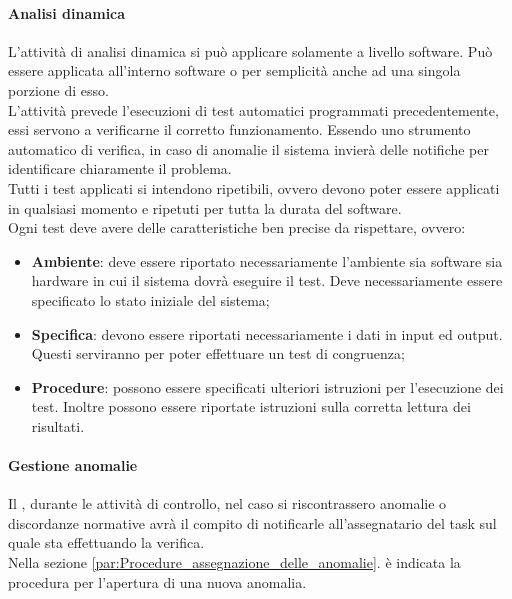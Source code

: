 			\paragraph{Analisi dinamica} %
			\label{par:analisi_dinamica}
			L'attività di analisi dinamica si può applicare solamente a livello software. Può essere applicata all'interno software o per semplicità anche ad una singola porzione di esso.\\
			L'attività prevede l'esecuzioni di test automatici programmati precedentemente, essi servono a verificarne il corretto funzionamento. Essendo uno strumento automatico di verifica, in caso di anomalie il sistema invierà delle notifiche per identificare chiaramente il problema.\\
			Tutti i test applicati si intendono ripetibili, ovvero devono poter essere applicati in qualsiasi momento e ripetuti per tutta la durata del software.\\
			Ogni test deve avere delle caratteristiche ben precise da rispettare, ovvero:
			\begin{itemize}
				\item \textbf{Ambiente}: deve essere riportato necessariamente l'ambiente sia software sia hardware in cui il sistema dovrà eseguire il test. Deve necessariamente essere specificato lo stato iniziale del sistema;
				\item \textbf{Specifica}: devono essere riportati necessariamente i dati in input ed output. Questi serviranno per poter effettuare un test di congruenza;
				\item \textbf{Procedure}: possono essere specificati ulteriori istruzioni per l'esecuzione dei test. Inoltre possono essere riportate istruzioni sulla corretta lettura dei risultati.
			\end{itemize}

			\paragraph{Gestione anomalie}
			Il \roleVerifier, durante le attività di controllo, nel caso si riscontrassero anomalie o discordanze normative avrà il compito di notificarle all'assegnatario del task sul quale sta effettuando la verifica.\\
			Nella sezione \ref{par:Procedure_assegnazione_delle_anomalie}. è indicata la procedura per l'apertura di una nuova anomalia.
			
